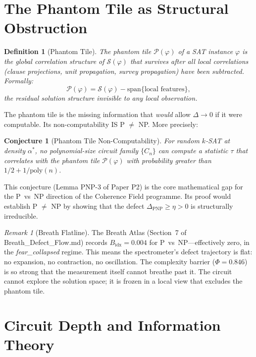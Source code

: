 \documentclass[12pt, openany]{book}
\newtheorem{conjecture}[theorem]{Conjecture}
\newtheorem{definition}[theorem]{Definition}
\theoremstyle{remark}
\newtheorem{remark}[theorem]{Remark}
\begin{document}
\section{The Phantom Tile as Structural Obstruction}
\label{sec:phantom-tile}

\begin{definition}[Phantom Tile]
\label{def:phantom-tile}
The \emph{phantom tile} $\mathcal{P}(\varphi)$ of a SAT instance $\varphi$ is
the global correlation structure of $\mathcal{S}(\varphi)$ that survives after
all local correlations (clause projections, unit propagation, survey propagation)
have been subtracted.  Formally:
\[
  \mathcal{P}(\varphi) = \mathcal{S}(\varphi) - \mathrm{span}\{\text{local features}\},
\]
the residual solution structure invisible to any local observation.
\end{definition}

\noindent
The phantom tile is the missing information that \emph{would} allow $\Delta \to 0$
if it were computable.  Its non-computability IS P $\neq$ NP.  More precisely:

\begin{conjecture}[Phantom Tile Non-Computability]
\label{conj:phantom-nc}
For random $k$-SAT at density $\alpha^*$, no polynomial-size circuit family
$\{C_n\}$ can compute a statistic $\tau$ that correlates with the phantom tile
$\mathcal{P}(\varphi)$ with probability greater than $1/2 + 1/\mathrm{poly}(n)$.
\end{conjecture}

\noindent
This conjecture (Lemma PNP-3 of Paper P2) is the core mathematical gap for the
P~vs~NP direction of the Coherence Field programme.  Its proof would establish
P $\neq$ NP by showing that the defect $\Delta_{\mathrm{PNP}} \geq \eta > 0$
is structurally irreducible.

\begin{remark}[Breath Flatline]
The Breath Atlas (Section~7 of Breath\_Defect\_Flow.md) records
$B_{\mathrm{idx}} = 0.004$ for P~vs~NP---effectively zero, in the
\emph{fear\_collapsed} regime.  This means the spectrometer's defect
trajectory is flat: no expansion, no contraction, no oscillation.
The complexity barrier ($\Phi = 0.846$) is so strong that the measurement
itself cannot breathe past it.  The circuit cannot explore the solution
space; it is frozen in a local view that excludes the phantom tile.
\end{remark}


\section{Circuit Depth and Information Theory}
\label{sec:circuit-info}
\end{document}
